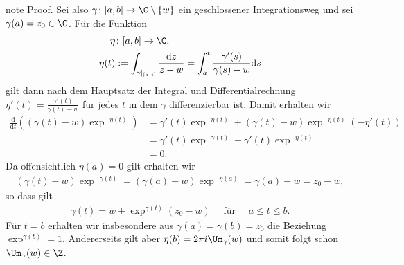 \documentclass[letterpaper,10pt,german]{jupyterBook}
\begin{document}
\begin{sphinxadmonition}{note}
\sphinxAtStartPar
Proof. Sei also \(\gamma \colon [a,b] \rightarrow \C \setminus \{w\}\) ein geschlossener Integrationsweg und sei \(\gamma(a) = z_0 \in \C\).
Für die Funktion
\begin{equation*}
\begin{split}\eta &\colon [a,b] \rightarrow \C, \\
\eta(t) &:= \int_{\gamma|_{[a,t]}} \frac{\mathrm{d}z}{z-w} = \int_a^t \frac{\gamma'(s)}{\gamma(s) - w} \mathrm{d}s \end{split}
\end{equation*}
\sphinxAtStartPar
gilt dann nach dem Hauptsatz der Integral\sphinxhyphen{} und Differentialrechnung \(\eta'(t) = \frac{\gamma'(t)}{\gamma(t)-w}\) für jedes \(t\) in dem \(\gamma\) differenzierbar ist.
Damit erhalten wir
\begin{equation*}
\begin{split}\frac{\mathrm{d}}{\mathrm{d}t} \left( (\gamma(t) - w)\exp^{-\eta(t)}\right) &= \gamma'(t)\exp^{-\eta(t)} + (\gamma(t) - w)\exp^{-\eta(t)}(-\eta'(t))\\
&= \gamma'(t)\exp^{-\gamma(t)} - \gamma'(t)\exp^{-\eta(t)}\\
&= 0.\end{split}
\end{equation*}
\sphinxAtStartPar
Da offensichtlich \(\eta(a) = 0\) gilt erhalten wir
\begin{equation*}
\begin{split}(\gamma(t) - w)\exp^{-\gamma(t)} = (\gamma(a) - w)\exp^{-\eta(a)} = \gamma(a) - w = z_0 - w,\end{split}
\end{equation*}
\sphinxAtStartPar
so dass gilt
\begin{equation*}
\begin{split}\gamma(t) = w + \exp^{\gamma(t)}(z_0 - w) \quad \text{ für } \quad a \leq t \leq b.\end{split}
\end{equation*}
\sphinxAtStartPar
Für \(t = b\) erhalten wir insbesondere aus \(\gamma(a) = \gamma(b) = z_0\) die Beziehung \(\exp^{\gamma(b)} = 1\).
Andererseits gilt aber \(\eta(b) = 2\pi i \Um_\gamma(w)\) und somit folgt schon \(\Um_\gamma(w) \in \Z\).


\end{sphinxadmonition}
\end{document}
